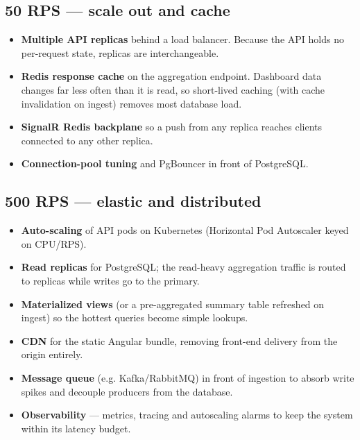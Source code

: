 \documentclass[11pt,a4paper]{article}
\begin{document}
\subsection{50 RPS --- scale out and cache}
\begin{itemize}[noitemsep]
  \item \textbf{Multiple API replicas} behind a load balancer. Because the API
        holds no per-request state, replicas are interchangeable.
  \item \textbf{Redis response cache} on the aggregation endpoint. Dashboard
        data changes far less often than it is read, so short-lived caching
        (with cache invalidation on ingest) removes most database load.
  \item \textbf{SignalR Redis backplane} so a push from any replica reaches
        clients connected to any other replica.
  \item \textbf{Connection-pool tuning} and PgBouncer in front of PostgreSQL.
\end{itemize}

\subsection{500 RPS --- elastic and distributed}
\begin{itemize}[noitemsep]
  \item \textbf{Auto-scaling} of API pods on Kubernetes (Horizontal Pod
        Autoscaler keyed on CPU/RPS).
  \item \textbf{Read replicas} for PostgreSQL; the read-heavy aggregation
        traffic is routed to replicas while writes go to the primary.
  \item \textbf{Materialized views} (or a pre-aggregated summary table refreshed
        on ingest) so the hottest queries become simple lookups.
  \item \textbf{CDN} for the static Angular bundle, removing front-end delivery
        from the origin entirely.
  \item \textbf{Message queue} (e.g. Kafka/RabbitMQ) in front of ingestion to
        absorb write spikes and decouple producers from the database.
  \item \textbf{Observability} --- metrics, tracing and autoscaling alarms to
        keep the system within its latency budget.
\end{itemize}
\end{document}
